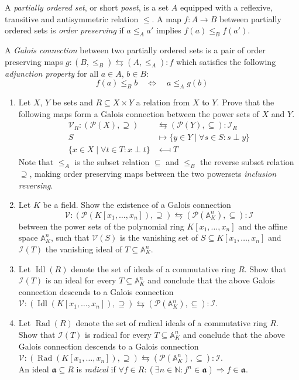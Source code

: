 \documentclass{exercises}
\DeclareMathOperator{\Idl}{Idl}
\DeclareMathOperator{\Rad}{Rad}
\begin{document}

\begin{exercise}
  A \emph{partially ordered set}, or short \emph{poset}, is a set $A$ equipped with a reflexive, transitive and antisymmetric relation $≤$.
  A map $f:A → B$ between partially ordered sets is \emph{order preserving} if $a ≤_A a'$ implies $f(a) ≤_B f(a')$.

  A \emph{Galois connection} between two partially ordered sets is a pair of order preserving maps $g:(B,≤_B) ⇆ (A,≤_A):f$ which satisfies the following \emph{adjunction property} for all $a ∈ A$, $b ∈ B$:
  $$
  f(a) ≤_B b \quad\Longleftrightarrow\quad a ≤_A g(b)
  $$
  \begin{enumerate}
    \item Let $X$, $Y$ be sets and $R ⊆ X × Y$ a relation from $X$ to $Y$.
      Prove that the following maps form a Galois connection between the power sets of $X$ and $Y$.
      \begin{align*}
        𝒱_R : (𝒫(X),⊇) &\leftrightarrows (𝒫(Y),⊆) : ℐ_R\\
        S & \longmapsto \{y ∈ Y \mid ∀s ∈ S:s \perp y\}\\
        \{x ∈ X \mid ∀t ∈ T:x \perp t\} & \longmapsfrom T
      \end{align*}
      {\scriptsize Note that $≤_A$ is the subset relation $⊆$ and $≤_B$ the reverse subset relation $⊇$, making order preserving maps between the two powersets \emph{inclusion reversing}.}
    \item Let $K$ be a field.
      Show the existence of a Galois connection
      $$
      𝒱:(𝒫(K[x_1,\dots,x_n]),⊇) ⇆ (𝒫(𝔸^n_K),⊆):ℐ
      $$
      between the power sets of the polynomial ring $K[x_1,\dots,x_n]$ and the affine space $𝔸^n_K$, such that $𝒱(S)$ is the vanishing set of $S⊆K[x_1,\dots,x_n]$ and $ℐ(T)$ the vanishing ideal of $T⊆𝔸^n_K$.
    \item Let $\Idl(R)$ denote the set of ideals of a commutative ring $R$.
      Show that $ℐ(T)$ is an ideal for every $T⊆𝔸^n_K$ and conclude that the above Galois connection descends to a Galois connection $𝒱:(\Idl(K[x_1,\dots,x_n]),⊇) ⇆ (𝒫(𝔸^n_K),⊆):ℐ$.
    \item Let $\Rad(R)$ denote the set of radical ideals of a commutative ring $R$.
      Show that $ℐ(T)$ is radical for every $T⊆𝔸^n_K$ and conclude that the above Galois connection descends to a Galois connection $𝒱:(\Rad(K[x_1,\dots,x_n]),⊇) ⇆ (𝒫(𝔸^n_K),⊆):ℐ$.\\
      {\scriptsize An ideal $𝖆 ⊆ R$ is \emph{radical} if $∀f ∈ R : (∃n ∈ ℕ : f^n ∈ 𝖆) ⇒ f ∈ 𝖆$.}
  \end{enumerate}
\end{exercise}
\end{document}
